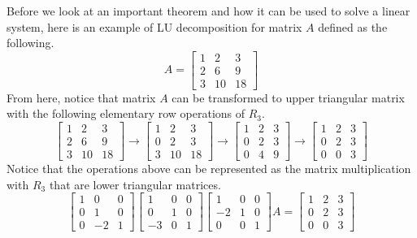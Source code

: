 \documentclass[../main.tex]{subfiles}
\begin{document}
Before we look at an important theorem and how it can be used to
solve a linear system, here is an example of LU decomposition
for matrix $A$ defined as the following.
\[
A =
\begin{bmatrix}
    1 & 2  & 3 \\
    2 & 6  & 9 \\
    3 & 10 & 18
\end{bmatrix}
\]
From here, notice that matrix $A$ can be transformed to upper
triangular matrix with the following elementary row operations of
$R_3$.
\[
\begin{bmatrix}
    1 & 2  & 3 \\
    2 & 6  & 9 \\
    3 & 10 & 18
\end{bmatrix}
\rightarrow
\begin{bmatrix}
    1 & 2  & 3 \\
    0 & 2  & 3 \\
    3 & 10 & 18
\end{bmatrix}
\rightarrow
\begin{bmatrix}
    1 & 2 & 3 \\
    0 & 2 & 3 \\
    0 & 4 & 9
\end{bmatrix}
\rightarrow
\begin{bmatrix}
    1 & 2 & 3 \\
    0 & 2 & 3 \\
    0 & 0 & 3
\end{bmatrix}
\]
Notice that the operations above can be represented as the
matrix multiplication with $R_3$ that are lower triangular matrices.
\[
\begin{bmatrix}
    1 & 0  & 0 \\
    0 & 1  & 0 \\
    0 & -2 & 1
\end{bmatrix}
\begin{bmatrix}
    1  & 0 & 0 \\
    0  & 1 & 0 \\
    -3 & 0 & 1
\end{bmatrix}
\begin{bmatrix}
    1  & 0 & 0 \\
    -2 & 1 & 0 \\
    0  & 0 & 1
\end{bmatrix}
A
=
\begin{bmatrix}
    1 & 2 & 3 \\
    0 & 2 & 3 \\
    0 & 0 & 3
\end{bmatrix}
\]
\end{document}
